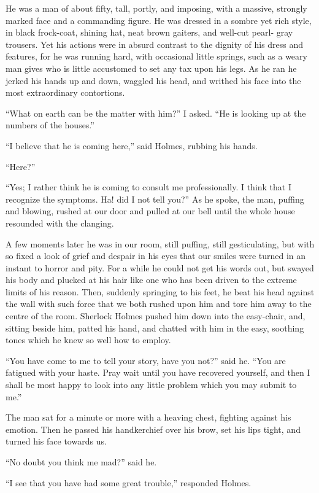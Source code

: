 He was a man of about fifty, tall, portly, and imposing,
with a massive, strongly marked face and a commanding
figure. He was dressed in a sombre yet rich style, in black
frock-coat, shining hat, neat brown gaiters, and well-cut pearl-%
gray trousers. Yet his actions were in absurd contrast to the
dignity of his dress and features, for he was running hard, with
occasional little springs, such as a weary man gives who is
little accustomed to set any tax upon his legs. As he ran he
jerked his hands up and down, waggled his head, and writhed
his face into the most extraordinary contortions.

“What on earth can be the matter with him?” I asked.
“He is looking up at the numbers of the houses.”

“I believe that he is coming here,” said Holmes, rubbing
his hands.

“Here?”

“Yes; I rather think he is coming to consult me professionally.
I think that I recognize the symptoms. Ha! did I
not tell you?” As he spoke, the man, puffing and blowing,
rushed at our door and pulled at our bell until the whole
house resounded with the clanging.

A few moments later he was in our room, still puffing, still
gesticulating, but with so fixed a look of grief and despair in
his eyes that our smiles were turned in an instant to horror
and pity. For a while he could not get his words out, but
swayed his body and plucked at his hair like one who has
been driven to the extreme limits of his reason. Then, suddenly
springing to his feet, he beat his head against the wall
with such force that we both rushed upon him and tore him
away to the centre of the room. Sherlock Holmes pushed
him down into the easy-chair, and, sitting beside him, patted
his hand, and chatted with him in the easy, soothing tones
which he knew so well how to employ.

“You have come to me to tell your story, have you not?”
said he. “You are fatigued with your haste. Pray wait until
you have recovered yourself, and then I shall be most happy
to look into any little problem which you may submit to me.”

The man sat for a minute or more with a heaving chest,
fighting against his emotion. Then he passed his handkerchief
over his brow, set his lips tight, and turned his face
towards us.

“No doubt you think me mad?” said he.

“I see that you have had some great trouble,” responded
Holmes.

